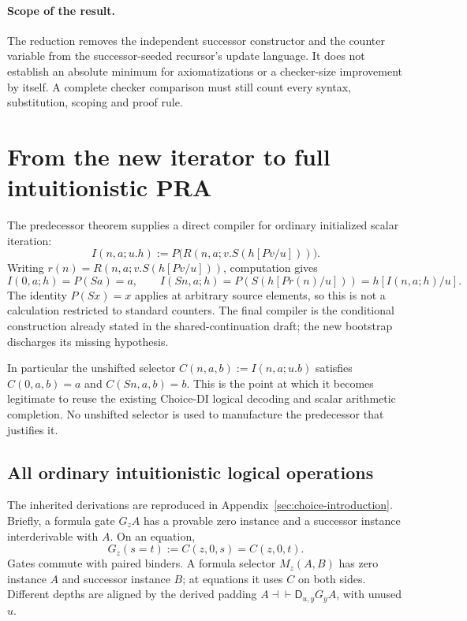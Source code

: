 \documentclass[11pt,letterpaper]{article}
\theoremstyle{definition}\newtheorem{definition}[theorem]{Definition}
\theoremstyle{remark}\newtheorem{remark}[theorem]{Remark}
\newcommand{\D}{\mathsf D}
\begin{document}
\paragraph{Scope of the result.}
The reduction removes the independent successor constructor and the
counter variable from the successor-seeded recursor's update language.
It does not establish an absolute minimum for axiomatizations or a
checker-size improvement by itself.  A complete checker comparison
must still count every syntax, substitution, scoping and proof rule.


\section{From the new iterator to full intuitionistic PRA}\label{sec:completion}

The predecessor theorem supplies a direct compiler for ordinary initialized
scalar iteration:
\begin{equation}
 I(n,a;u.h):=P\bigl(R(n,a;v.S(h[Pv/u]))\bigr).
 \label{eq:initialization-compiler}
\end{equation}
Writing $r(n)=R(n,a;v.S(h[Pv/u]))$, computation gives
\[
 I(0,a;h)=P(Sa)=a,
 \qquad I(Sn,a;h)=P(S(h[Pr(n)/u]))=h[I(n,a;h)/u].
\]
The identity $P(Sx)=x$ applies at arbitrary source elements, so this is
not a calculation restricted to standard counters. The final compiler is
the conditional construction already stated in the shared-continuation
draft\cite{shared}; the new bootstrap discharges its missing hypothesis.

In particular the unshifted selector
$C(n,a,b):=I(n,a;u.b)$ satisfies $C(0,a,b)=a$ and $C(Sn,a,b)=b$.
This is the point at which it becomes legitimate to reuse the existing
Choice-DI logical decoding and scalar arithmetic completion. No unshifted
selector is used to manufacture the predecessor that justifies it.

\subsection{All ordinary intuitionistic logical operations}

The inherited derivations are reproduced in
Appendix~\ref{sec:choice-introduction}. Briefly, a formula gate $G_zA$
has a provable zero instance and a successor instance interderivable
with $A$. On an equation,
\[
 G_z(s=t):=C(z,0,s)=C(z,0,t).
\]
Gates commute with paired binders. A formula selector $M_z(A,B)$ has
zero instance $A$ and successor instance $B$; at equations it uses $C$
on both sides. Different depths are aligned by the derived padding
$A\dashv\vdash\D_{u,y}G_yA$, with unused $u$.
\end{document}
